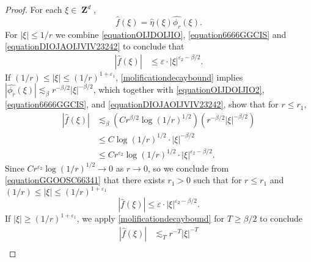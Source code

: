 \documentclass[dvipsnames,letterpaper,12pt]{article}
\numberwithin{equation}{section}
\DeclareMathOperator{\ZZ}{\mathbf{Z}}
\numberwithin{theorem}{section}
\begin{document}
\begin{proof}
    For each $\xi \in \ZZ^d$,
    \begin{equation} \label{equation6666GGCIS}
        \widehat{f}(\xi) = \widehat{\eta}(\xi) \widehat{\phi_r}(\xi).
    \end{equation}
    For $|\xi| \leq 1/r$ we combine \eqref{equationOIJDOIJIO}, \eqref{equation6666GGCIS} and \eqref{equationDIOJAOIJVIV23242} to conclude that
    \begin{equation} \label{equationGGIOHISI99234}
    \begin{split}
        |\widehat{f}(\xi)| &\leq \varepsilon \cdot |\xi|^{\varepsilon_2 - \beta/2}.
    \end{split}
    \end{equation}
    If $(1/r) \leq |\xi| \leq (1/r)^{1+\varepsilon_1}$, \eqref{molificationdecaybound} implies $|\widehat{\phi_{r}}(\xi)| \lesssim_\beta r^{-\beta/2} |\xi|^{-\beta/2}$, which together with \eqref{equationOIJDOIJIO2}, \eqref{equation6666GGCIS}, and \eqref{equationDIOJAOIJVIV23242}, show that for $r \leq r_1$,
    \begin{equation} \label{equationGGOOSC66341}
    \begin{split}
        |\widehat{f}(\xi)| &\lesssim_\beta \left( C r^{\beta/2} \log(1/r)^{1/2} \right) \left( r^{-\beta/2} |\xi|^{-\beta/2} \right)\\
        &\leq C \log(1/r)^{1/2} \cdot |\xi|^{-\beta/2}\\
        &\leq C r^{\varepsilon_2} \log(1/r)^{1/2} \cdot |\xi|^{\varepsilon_2-\beta/2}.
    \end{split}
    \end{equation}
    Since $C r^{\varepsilon_2} \log(1/r)^{1/2} \to 0$ as $r \to 0$, so we conclude from \eqref{equationGGOOSC66341} that there exists $r_1 > 0$ such that for $r \leq r_1$ and $(1/r) \leq |\xi| \leq (1/r)^{1 + \varepsilon_1}$
    \begin{equation} \label{equationUUUDDDCII777}
        |\widehat{f}(\xi)| \leq \varepsilon \cdot |\xi|^{\varepsilon_2-\beta/2}.
    \end{equation}
    If $|\xi| \geq (1/r)^{1 + \varepsilon_1}$, we apply \eqref{molificationdecaybound} for $T \geq \beta/2$ to conclude
    \begin{equation} \label{equationGGUSCCCYVSSXX998723}
    \begin{split}
        |\widehat{f}(\xi)| &\lesssim_T r^{-T} |\xi|^{-T}\\

\end{split}
\end{equation}
\end{proof}
\end{document}
